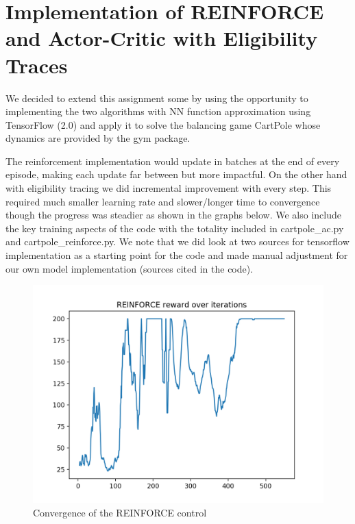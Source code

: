 \documentclass{article}[12pt]
\begin{document}
\section{Implementation of REINFORCE and Actor-Critic with Eligibility Traces}
We decided to extend this assignment some by using the opportunity to implementing the two algorithms with NN function approximation using TensorFlow (2.0) and apply it to solve the balancing game CartPole whose dynamics are provided by the gym package. 

The reinforcement implementation would update in batches at the end of every episode, making each update far between but more impactful. On the other hand with eligibility tracing we did incremental improvement with every step. This required much smaller learning rate and slower/longer time to convergence  though the progress was steadier as shown in the graphs below. We also include the key training aspects of the code with the totality included in cartpole\_ac.py and cartpole\_reinforce.py. We note that we did look at two sources for tensorflow implementation as a starting point for the code and made manual adjustment for our own model implementation (sources cited in the code).


\begin{figure}[h]
  \includegraphics[width=\linewidth]{RF_conv.png}
  \caption{Convergence of the REINFORCE control}
  \label{fig:optPol1}
\end{figure}
\end{document}
